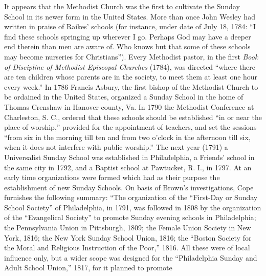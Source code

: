 It appears that the Methodist Church was the first to cultivate the Sunday School in its newer form in the United
States. More than once John Wesley had written in praise of Raikes’ schools (for instance, under date of July 18, 1784: “I find these schools springing up wherever I go. Perhaps God may have a deeper end therein than men are aware of. Who knows but that some of these schools may become nurseries for Christians”). Every Methodist pastor, in the first \emph{Book of Discipline of Methodist Episcopal Churches} (1784), was directed “where there are ten children whose parents are in the society, to meet them at least one hour every week.” In 1786 Francis Asbury, the first bishop of the Methodist Church to be ordained in the United States, organized a Sunday School in the home of Thomas Crenshaw in Hanover county, Va. In 1790 the Methodist Conference at Charleston, S. C., ordered that these schools should be established “in or near the place of worship,” provided for the appointment of teachers, and set the sessions “from six in the morning till ten and from two o’clock in the afternoon till six, when it does not interfere with public worship.” The next year (1791) a Universalist Sunday School was established in Philadelphia, a Friends’ school in the same city in 1792, and a Baptist school at Pawtucket, R. I., in 1797. At an early time organizations were formed which had as their purpose the establishment of new Sunday Schools. On basis of Brown’s investigations, Cope furnishes the following summary: “The organization of the “First-Day or Sunday School Society” of Philadelphia, in 1791, was followed in 1808 by the organization of the “Evangelical Society” to promote Sunday evening schools in Philadelphia; the Pennsylvania Union in Pittsburgh, 1809; the Female Union Society in New York, 1816; the New York Sunday School Union, 1816; the “Boston Society for the Moral and Religious Instruction of the Poor,” 1816. All these were of local influence only, but a wider scope was designed for the “Philadelphia Sunday and Adult School Union,” 1817, for it planned to promote

